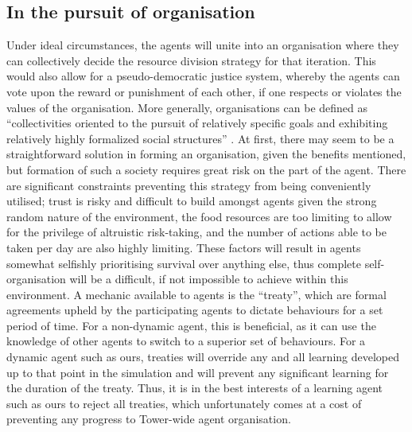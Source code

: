 \subsection{In the pursuit of organisation}
Under ideal circumstances, the agents will unite into an organisation where they can collectively decide the resource division strategy for that iteration. This would also allow for a pseudo-democratic justice system, whereby the agents can vote upon the reward or punishment of each other, if one respects or violates the values of the organisation. More generally, organisations can be defined as “collectivities oriented to the pursuit of relatively specific goals and exhibiting relatively highly formalized social structures” \cite{WhettenDavidA1983ORNa}. At first, there may seem to be a straightforward solution in forming an organisation, given the benefits mentioned, but formation of such a society requires great risk on the part of the agent. There are significant constraints preventing this strategy from being conveniently utilised; trust is risky and difficult to build amongst agents given the strong random nature of the environment, the food resources are too limiting to allow for the privilege of altruistic risk-taking, and the number of actions able to be taken per day are also highly limiting. These factors will result in agents somewhat selfishly prioritising survival over anything else, thus complete self-organisation will be a difficult, if not impossible to achieve within this environment. A mechanic available to agents is the “treaty”, which are formal agreements upheld by the participating agents to dictate behaviours for a set period of time. For a non-dynamic agent, this is beneficial, as it can use the knowledge of other agents to switch to a superior set of behaviours. For a dynamic agent such as ours, treaties will override any and all learning developed up to that point in the simulation and will prevent any significant learning for the duration of the treaty. Thus, it is in the best interests of a learning agent such as ours to reject all treaties, which unfortunately comes at a cost of preventing any progress to Tower-wide agent organisation. 
